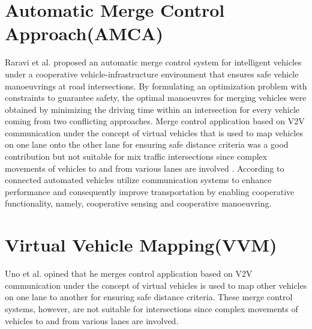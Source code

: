 \documentclass{book}
\begin{document}
\section{ Automatic Merge Control Approach(AMCA)}
	Raravi et al.\cite{raravi2007merge} proposed an automatic merge control system for intelligent vehicles under a cooperative vehicle-infrastructure environment that ensures safe vehicle manoeuvrings at road intersections. By formulating an optimization problem with constraints to guarantee safety, the optimal manoeuvres for merging vehicles were obtained by minimizing the driving time within an intersection for every vehicle coming from two conflicting approaches. Merge control application based on V2V communication under the concept of virtual vehicles that is used to map vehicles on one lane onto the other lane for ensuring safe distance criteria was a good contribution but not suitable for mix traffic intersections since complex movements of vehicles to and from various lanes are involved \cite{uno1999merging}. According to\cite{montanaro2018towards} connected automated vehicles utilize communication systems to enhance performance  and consequently improve transportation by enabling cooperative functionality, namely, cooperative sensing and cooperative manoeuvring.

	\section{Virtual Vehicle Mapping(VVM)} Uno et al.\cite{uno1999merging} opined that he merges control application based on V2V communication under the concept of virtual vehicles is used to map other vehicles on one lane to another for
ensuring safe distance criteria. These merge control systems, however, are not suitable for intersections since complex movements of vehicles to and from various lanes are involved.
\end{document}
